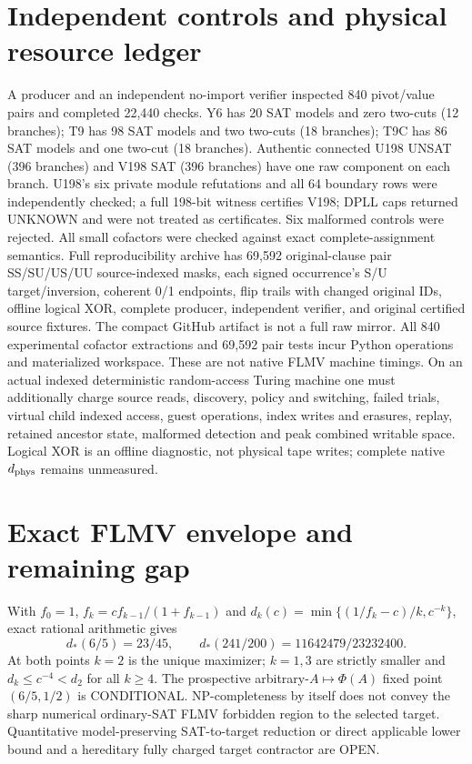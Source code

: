 \documentclass[10pt]{article}
\begin{document}
\section{Independent controls and physical resource ledger}
A producer and an independent no-import verifier inspected 840 pivot/value pairs and completed 22,440 checks. Y6 has 20 SAT models and zero two-cuts (12 branches); T9 has 98 SAT models and two two-cuts (18 branches); T9C has 86 SAT models and one two-cut (18 branches). Authentic connected U198 UNSAT (396 branches) and V198 SAT (396 branches) have one raw component on each branch. U198's six private module refutations and all 64 boundary rows were independently checked; a full 198-bit witness certifies V198; DPLL caps returned UNKNOWN and were not treated as certificates. Six malformed controls were rejected. All small cofactors were checked against exact complete-assignment semantics.
Full reproducibility archive has 69,592 original-clause pair SS/SU/US/UU source-indexed masks, each signed occurrence's S/U target/inversion, coherent 0/1 endpoints, flip trails with changed original IDs, offline logical XOR, complete producer, independent verifier, and original certified source fixtures. The compact GitHub artifact is not a full raw mirror.
All 840 experimental cofactor extractions and 69,592 pair tests incur Python operations and materialized workspace. These are not native FLMV machine timings. On an actual indexed deterministic random-access Turing machine one must additionally charge source reads, discovery, policy and switching, failed trials, virtual child indexed access, guest operations, index writes and erasures, replay, retained ancestor state, malformed detection and peak combined writable space. Logical XOR is an offline diagnostic, not physical tape writes; complete native $d_{\rm phys}$ remains unmeasured.
\section{Exact FLMV envelope and remaining gap}
With $f_0=1$, $f_k=cf_{k-1}/(1+f_{k-1})$ and $d_k(c)=\min\{(1/f_k-c)/k,c^{-k}\}$, exact rational arithmetic gives
\[
d_*(6/5)=23/45,\qquad d_*(241/200)=11642479/23232400.
\]
At both points $k=2$ is the unique maximizer; $k=1,3$ are strictly smaller and $d_k\le c^{-4}<d_2$ for all $k\ge4$. The prospective arbitrary-$A\mapsto\Phi(A)$ fixed point $(6/5,1/2)$ is CONDITIONAL. NP-completeness by itself does not convey the sharp numerical ordinary-SAT FLMV forbidden region to the selected target. Quantitative model-preserving SAT-to-target reduction or direct applicable lower bound and a hereditary fully charged target contractor are OPEN.
\end{document}
